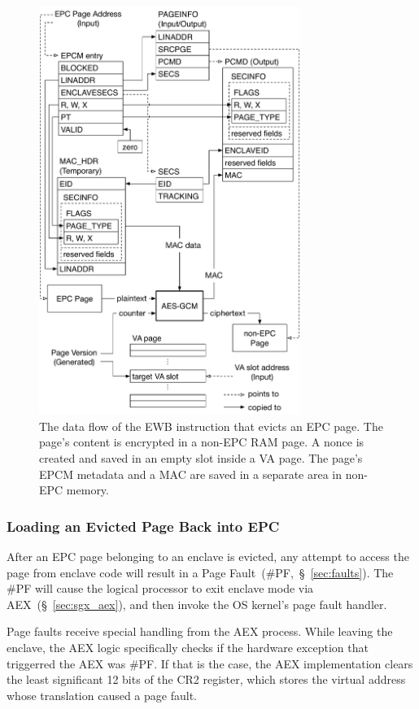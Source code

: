 \begin{figure}[hbt]
  \centering
  \includegraphics[width=85mm]{figures/sgx_ewb.pdf}
  \caption{
    The data flow of the EWB instruction that evicts an EPC page. The page's
    content is encrypted in a non-EPC RAM page. A nonce is created and saved
    in an empty slot inside a VA page. The page's EPCM metadata and a MAC
    are saved in a separate area in non-EPC memory.
  }
  \label{fig:sgx_ewb}
\end{figure}


\subsubsection{Loading an Evicted Page Back into EPC}


After an EPC page belonging to an enclave is evicted, any attempt to access the
page from enclave code will result in a Page Fault~(\#PF,~\S~\ref{sec:faults}).
The \#PF will cause the logical processor to exit enclave mode via
AEX~(\S~\ref{sec:sgx_aex}), and then invoke the OS kernel's page fault handler.

Page faults receive special handling from the AEX process. While leaving the
enclave, the AEX logic specifically checks if the hardware exception that
triggerred the AEX was \#PF. If that is the case, the AEX implementation clears
the least significant 12 bits of the CR2 register, which stores the virtual
address whose translation caused a page fault.

